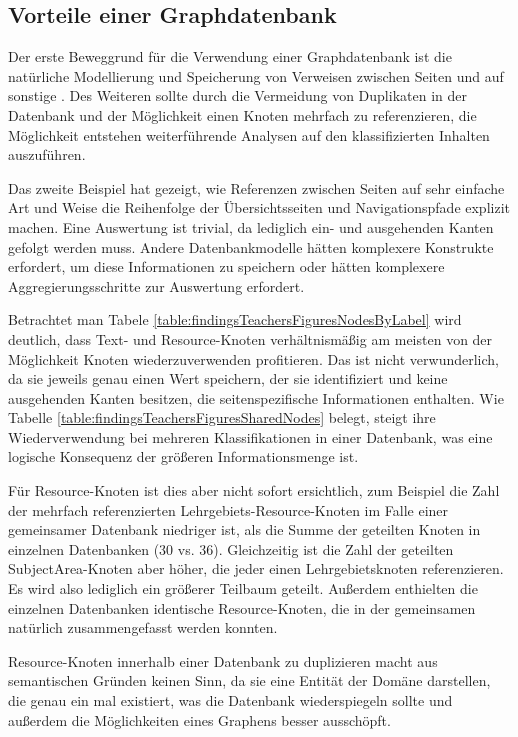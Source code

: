 \subsection{Vorteile einer Graphdatenbank}
    Der erste Beweggrund für die Verwendung einer Graphdatenbank
    ist die natürliche Modellierung und Speicherung von Verweisen
    zwischen Seiten und auf sonstige {\resources}.
    Des Weiteren sollte durch die Vermeidung von Duplikaten in der Datenbank
    und der Möglichkeit einen Knoten mehrfach zu referenzieren,
    die Möglichkeit entstehen weiterführende Analysen auf den klassifizierten
    Inhalten auszuführen.

    Das zweite Beispiel hat gezeigt,
    wie Referenzen zwischen Seiten auf sehr einfache Art und Weise
    die Reihenfolge der Übersichtsseiten und Navigationspfade explizit machen.
    Eine Auswertung ist trivial, da lediglich ein- und ausgehenden Kanten gefolgt werden muss.
    Andere Datenbankmodelle hätten komplexere Konstrukte erfordert,
    um diese Informationen zu speichern oder hätten komplexere
    Aggregierungsschritte zur Auswertung erfordert.

    Betrachtet man Tabele \ref{table:findingsTeachersFiguresNodesByLabel} wird deutlich,
    dass Text- und Resource-Knoten verhältnismäßig am meisten von der
    Möglichkeit Knoten wiederzuverwenden profitieren.
    Das ist nicht verwunderlich, da sie jeweils genau einen Wert speichern,
    der sie identifiziert und keine ausgehenden Kanten besitzen,
    die seitenspezifische Informationen enthalten.
    Wie Tabelle \ref{table:findingsTeachersFiguresSharedNodes} belegt,
    steigt ihre Wiederverwendung bei mehreren Klassifikationen in einer Datenbank,
    was eine logische Konsequenz der größeren Informationsmenge ist.

    Für Resource-Knoten ist dies aber nicht sofort ersichtlich,
    zum Beispiel die Zahl der mehrfach referenzierten
    Lehrgebiets-Resource-Knoten im Falle einer gemeinsamer Datenbank niedriger ist,
    als die Summe der geteilten Knoten in einzelnen Datenbanken (30 vs. 36).
    Gleichzeitig ist die Zahl der geteilten SubjectArea-Knoten aber höher,
    die jeder einen Lehrgebietsknoten referenzieren.
    Es wird also lediglich ein größerer Teilbaum geteilt.
    Außerdem enthielten die einzelnen Datenbanken identische Resource-Knoten,
    die in der gemeinsamen natürlich zusammengefasst werden konnten.

    Resource-Knoten innerhalb einer Datenbank zu duplizieren
    macht aus semantischen Gründen keinen Sinn,
    da sie eine Entität der Domäne darstellen,
    die genau ein mal existiert, was die Datenbank wiederspiegeln sollte
    und außerdem die Möglichkeiten eines Graphens besser ausschöpft.

